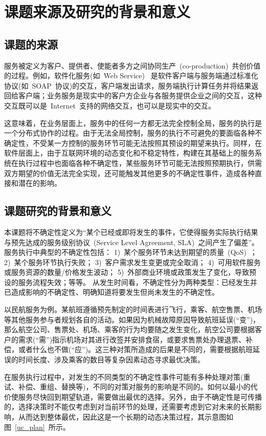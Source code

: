 \section{课题来源及研究的背景和意义}
\subsection{课题的来源}

服务被定义为客户、提供者、使能者多方之间协同生产~(co-production)~共创价值的过程。例如，软件化服务(如~Web Service)~ 是软件客户端与服务端通过标准化协议(如~SOAP~协议)的交互，客户端发出请求，服务端执行计算任务并将结果返回给客户端；业务服务是现实中的客户方企业与各服务提供企业之间的交互，这种交互既可以是~Internet~支持的网络交互，也可以是现实中的交互。

这意味着，在业务层面上，服务中的任何一方都无法完全控制全局，服务的执行是一个分布式协作的过程。由于无法全局控制，服务的执行不可避免的要面临各种不确定性，不受某一方控制的服务环节可能无法按照其预设的期望来执行。同样，在软件层面上，由于互联网环境的动态变化和不稳定特性，构建在其基础上的服务系统在执行过程中也面临各种不确定性，某些服务环节可能无法按照预期执行，供需双方期望的价值无法完全实现，还可能触发其他更多的不确定性事件，造成各种直接和潜在的影响。

\subsection{课题研究的背景和意义}
本课题将不确定性定义为“某个已经或即将发生的事件，它使得服务实际执行结果与预先达成的服务级别协议~(Service Level Agreement, SLA)~之间产生了偏差”。服务执行中典型的不确定性包括：
1)~某个服务环节未达到期望的质量~(QoS)~；
2)~某个服务环节执行失败；
3)~客户需求发生变更或完全取消；
4)~可用软件服务或服务资源的数量/价格发生波动；
5)~外部商业环境或政策发生了变化，导致预设的服务流程失效；等等。
从发生时间看，不确定性分为两种类型：已经发生并已造成影响的不确定性、明确知道将要发生但尚未发生的不确定性。

以民航服务为例。某航班遵循预先制定的时间表进行飞行，乘客、航空售票、机场等其他服务参与者规划各自的活动。如果因为机械故障原因导致航班延误(“变”)，那么航空公司、售票处、机场、乘客的行为均要随之发生变化，航空公司要根据客户的需求(“需”)指示机场对其进行改签并安排食宿，或要求售票处办理退票、补偿，或者什么也不做(“应”)。这三种对策所造成的后果是不同的，需要根据航班延误的时间长度、涉及乘客的数目等复杂因素动态寻求最优决策。

在服务执行过程中，对发生的不同类型的不确定性事件可能有多种处理对策(重试、补偿、重组、替换等)，不同的对策对服务的影响是不同的。如何以最小的代价使服务尽快回到期望轨道，需要做出最优的选择。另外，由于不确定性是可传播的，选择决策时不能仅考虑到对当前环节的处理，还需要考虑到它对未来的长期影响，从而达到整体最优，因此这是一个长期的动态决策过程，其示意图如图~\ref{uc_plan}~所示。

